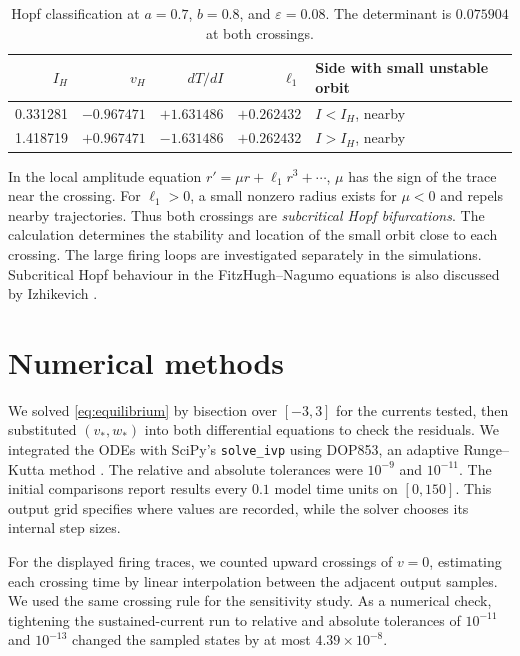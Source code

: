 \documentclass[11pt,a4paper]{article}
\begin{document}
\begin{table}[H]
  \centering
  \caption{Hopf classification at \(a=0.7\), \(b=0.8\), and \(\varepsilon=0.08\). The determinant is \(0.075904\) at both crossings.}
  \label{tab:hopf}
  \begin{tabular}{@{}rrrrl@{}}
    \toprule
    \(I_H\) & \(v_H\) & \(dT/dI\) & \(\ell_1\) & Side with small unstable orbit\\
    \midrule
    0.331281 & \(-0.967471\) & \(+1.631486\) & \(+0.262432\) & \(I<I_H\), nearby\\
    1.418719 & \(+0.967471\) & \(-1.631486\) & \(+0.262432\) & \(I>I_H\), nearby\\
    \bottomrule
  \end{tabular}
\end{table}

In the local amplitude equation \(r'=\mu r+\ell_1r^3+\cdots\), \(\mu\) has the sign of the trace near the crossing. For \(\ell_1>0\), a small nonzero radius exists for \(\mu<0\) and repels nearby trajectories. Thus both crossings are \emph{subcritical Hopf bifurcations}. The calculation determines the stability and location of the small orbit close to each crossing. The large firing loops are investigated separately in the simulations. Subcritical Hopf behaviour in the FitzHugh--Nagumo equations is also discussed by Izhikevich \cite{izhikevich2000}.

\clearpage

\section{Numerical methods}

We solved \eqref{eq:equilibrium} by bisection over \([-3,3]\) for the currents tested, then substituted \((v_*,w_*)\) into both differential equations to check the residuals. We integrated the ODEs with SciPy's \texttt{solve\_ivp} using DOP853, an adaptive Runge--Kutta method \cite{scipy1153}. The relative and absolute tolerances were \(10^{-9}\) and \(10^{-11}\). The initial comparisons report results every \(0.1\) model time units on \([0,150]\). This output grid specifies where values are recorded, while the solver chooses its internal step sizes.

For the displayed firing traces, we counted upward crossings of \(v=0\), estimating each crossing time by linear interpolation between the adjacent output samples. We used the same crossing rule for the sensitivity study. As a numerical check, tightening the sustained-current run to relative and absolute tolerances of \(10^{-11}\) and \(10^{-13}\) changed the sampled states by at most \(4.39\times10^{-8}\).
\end{document}
